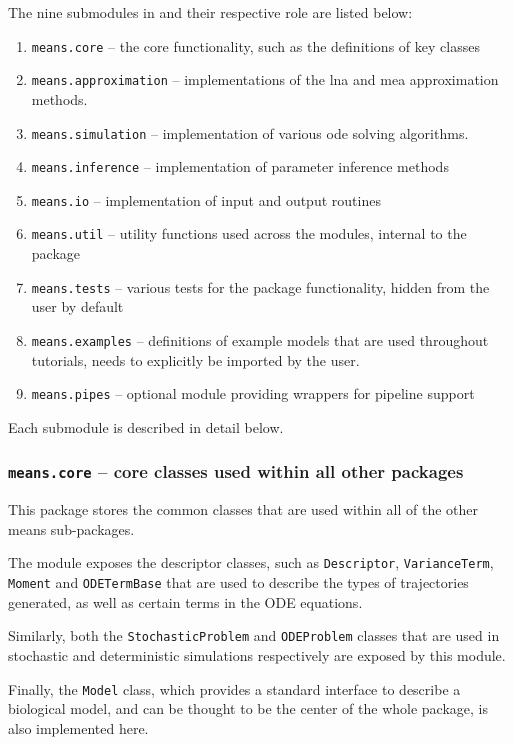 The nine submodules in \means{} and their respective role are listed below:
\begin{enumerate}
    \item \verb"means.core" -- the core functionality, such as the definitions of key classes
    \item \verb"means.approximation" -- implementations of the \gls{lna} and \gls{mea} approximation methods.
    
    \item \verb"means.simulation" -- implementation of various \gls{ode} solving algorithms.
    \item \verb"means.inference" -- implementation of parameter inference methods
    \item \verb"means.io" -- implementation of input and output routines
    \item \verb"means.util" -- utility functions used across the modules, internal to the package
    \item \verb"means.tests" -- various tests for the package functionality, hidden from the user by default
    \item \verb"means.examples" -- definitions of example models that are used throughout tutorials, needs to explicitly be imported by the user.
    \item \verb"means.pipes" -- optional module providing wrappers for pipeline support
\end{enumerate}

Each submodule is described in detail below.

\subsubsection{{\tt means.core} -- core classes used within all other packages}
This package stores the common classes that are used within all of the other means sub-packages.

The module exposes the descriptor classes, such as \verb"Descriptor",
\verb"VarianceTerm", \verb"Moment" and
\verb"ODETermBase" that are used to describe the types of trajectories generated,
as well as certain terms in the ODE equations.

Similarly, both the \verb"StochasticProblem" and
\verb"ODEProblem" classes that are used in stochastic and deterministic simulations respectively are exposed by this module.

Finally, the \verb"Model" class, which provides a standard interface to describe a biological model, and can be thought to be the center of the whole package, is also implemented here.


